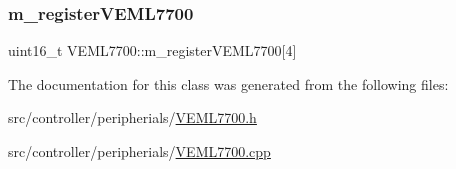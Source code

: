 \mbox{\label{classVEML7700_a8e5c194037bceb4544cc1a7b05f697bb}} 
\subsubsection{\texorpdfstring{m\+\_\+register\+V\+E\+M\+L7700}{m\_registerVEML7700}}
{\footnotesize\ttfamily uint16\+\_\+t V\+E\+M\+L7700\+::m\+\_\+register\+V\+E\+M\+L7700\mbox{[}4\mbox{]}\hspace{0.3cm}{\ttfamily [private]}}



The documentation for this class was generated from the following files\+:\begin{DoxyCompactItemize}
\item 
src/controller/peripherials/\hyperlink{VEML7700_8h}{V\+E\+M\+L7700.\+h}\item 
src/controller/peripherials/\hyperlink{VEML7700_8cpp}{V\+E\+M\+L7700.\+cpp}\end{DoxyCompactItemize}
